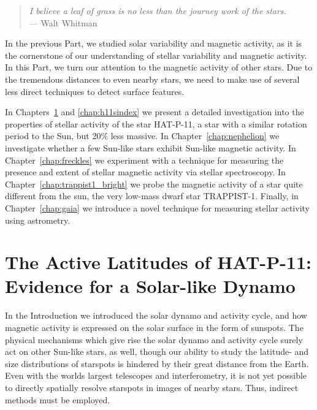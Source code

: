 \documentclass[12pt, twoside]{uwthesis}
\begin{document}
\begin{verse}
{\it I believe a leaf of grass is no less than the journey work of the stars.\\}
\hfill --- Walt Whitman
\end{verse}

In the previous Part, we studied solar variability and magnetic activity, as it is the cornerstone of our understanding of stellar variability and magnetic activity. In this Part, we turn our attention to the magnetic activity of other stars. Due to the tremendous distances to even nearby stars, we need to make use of several less direct techniques to detect surface features. 

In Chapters~\ref{chap:h11} and \ref{chap:h11sindex} we present a detailed investigation into the properties of stellar activity of the star HAT-P-11, a star with a similar rotation period to the Sun, but 20\% less massive. In Chapter~\ref{chap:nephelion} we investigate whether a few Sun-like stars exhibit Sun-like magnetic activity. In Chapter~\ref{chap:freckles} we experiment with a technique for measuring the presence and extent of stellar magnetic activity via stellar spectroscopy. In Chapter~\ref{chap:trappist1_bright} we probe the magnetic activity of a star quite different from the sun, the very low-mass dwarf star TRAPPIST-1. Finally, in Chapter~\ref{chap:gaia} we introduce a novel technique for measuring stellar activity using astrometry. 

\chapter{The Active Latitudes of HAT-P-11: Evidence for a Solar-like Dynamo} \label{chap:h11}

In the Introduction we introduced the solar dynamo and activity cycle, and how magnetic activity is expressed on the solar surface in the form of sunspots. The physical mechanisms which give rise the solar dynamo and activity cycle surely act on other Sun-like stars, as well, though our ability to study the latitude- and size distributions of starspots is hindered by their great distance from the Earth. Even with the worlds largest telescopes and interferometry, it is not yet possible to directly spatially resolve starspots in images of nearby stars. Thus, indirect methods must be employed.
\end{document}
